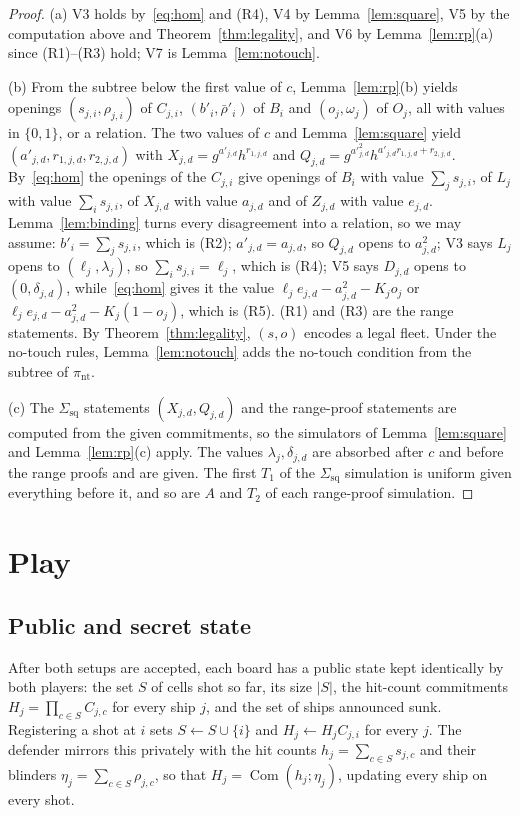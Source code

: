 \documentclass[11pt]{article}
\theoremstyle{definition}
\theoremstyle{remark}
\newcommand{\Com}{\operatorname{Com}}
\newcommand{\Sq}{\Sigma_{\mathrm{sq}}}
\begin{document}
\begin{proof}
(a) V3 holds by~\eqref{eq:hom} and (R4), V4 by Lemma~\ref{lem:square}, V5 by the computation above and Theorem~\ref{thm:legality}, and V6 by Lemma~\ref{lem:rp}(a) since (R1)--(R3) hold; V7 is Lemma~\ref{lem:notouch}.

(b) From the subtree below the first value of $c$, Lemma~\ref{lem:rp}(b) yields openings $(s_{j,i},\rho_{j,i})$ of $C_{j,i}$, $(b'_i,\bar\rho'_i)$ of $B_i$ and $(o_j,\omega_j)$ of $O_j$, all with values in $\{0,1\}$, or a relation. The two values of $c$ and Lemma~\ref{lem:square} yield $(a'_{j,d},r_{1,j,d},r_{2,j,d})$ with $X_{j,d}=g^{a'_{j,d}}h^{r_{1,j,d}}$ and $Q_{j,d}=g^{a'^2_{j,d}}h^{a'_{j,d}r_{1,j,d}+r_{2,j,d}}$. By~\eqref{eq:hom} the openings of the $C_{j,i}$ give openings of $B_i$ with value $\sum_js_{j,i}$, of $L_j$ with value $\sum_is_{j,i}$, of $X_{j,d}$ with value $a_{j,d}$ and of $Z_{j,d}$ with value $e_{j,d}$. Lemma~\ref{lem:binding} turns every disagreement into a relation, so we may assume: $b'_i=\sum_js_{j,i}$, which is (R2); $a'_{j,d}=a_{j,d}$, so $Q_{j,d}$ opens to $a_{j,d}^2$; V3 says $L_j$ opens to $(\ell_j,\lambda_j)$, so $\sum_is_{j,i}=\ell_j$, which is (R4); V5 says $D_{j,d}$ opens to $(0,\delta_{j,d})$, while~\eqref{eq:hom} gives it the value $\ell_je_{j,d}-a_{j,d}^2-K_jo_j$ or $\ell_je_{j,d}-a_{j,d}^2-K_j(1-o_j)$, which is (R5). (R1) and (R3) are the range statements. By Theorem~\ref{thm:legality}, $(s,o)$ encodes a legal fleet. Under the no-touch rules, Lemma~\ref{lem:notouch} adds the no-touch condition from the subtree of $\pi_{\mathrm{nt}}$.

(c) The $\Sq$ statements $(X_{j,d},Q_{j,d})$ and the range-proof statements are computed from the given commitments, so the simulators of Lemma~\ref{lem:square} and Lemma~\ref{lem:rp}(c) apply. The values $\lambda_j,\delta_{j,d}$ are absorbed after $c$ and before the range proofs and are given. The first $T_1$ of the $\Sq$ simulation is uniform given everything before it, and so are $A$ and $T_2$ of each range-proof simulation.
\end{proof}

\section{Play}\label{sec:play}
\subsection{Public and secret state}\label{sec:state}
After both setups are accepted, each board has a public state kept identically by both players: the set $S$ of cells shot so far, its size $|S|$, the hit-count commitments $H_j=\prod_{c\in S}C_{j,c}$ for every ship $j$, and the set of ships announced sunk. Registering a shot at $i$ sets $S\gets S\cup\{i\}$ and $H_j\gets H_jC_{j,i}$ for every $j$. The defender mirrors this privately with the hit counts $h_j=\sum_{c\in S}s_{j,c}$ and their blinders $\eta_j=\sum_{c\in S}\rho_{j,c}$, so that $H_j=\Com(h_j;\eta_j)$, updating every ship on every shot.
\end{document}

